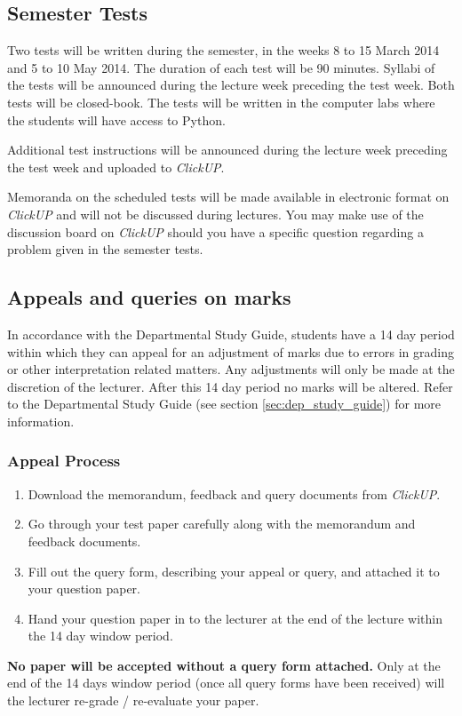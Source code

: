     \subsection{Semester Tests}
        Two tests will be written during the semester, in the weeks 8 to 15
        March 2014 and 5 to 10 May 2014. The duration of each test will be
        90 minutes. Syllabi of the tests will be announced during the lecture
        week preceding the test week. Both tests will be closed-book. The
        tests will be written in the computer labs where the students will
        have access to Python.

        Additional test instructions will be announced during the lecture
        week preceding the test week and uploaded to {\it ClickUP}.

        Memoranda on the scheduled tests will be made available in electronic
        format on {\it ClickUP} and will not be discussed during lectures. You may
        make use of the discussion board on {\it ClickUP} should you have a specific
        question regarding a problem given in the semester tests.

    \subsection{Appeals and queries on marks}
        In accordance with the Departmental Study Guide, students have a 14
        day period within which they can appeal for an adjustment of marks
        due to errors in grading or other interpretation related matters.
        Any adjustments will only be made at the discretion of the lecturer.
        After this 14 day period no marks will be altered. Refer to the
        Departmental Study Guide (see section \ref{sec:dep_study_guide})
        for more information.

        \subsubsection{Appeal Process}
            \begin{enumerate}
                \item Download the memorandum, feedback and query documents
                    from {\it ClickUP}.
                \item Go through your test paper carefully along with the
                    memorandum and feedback documents.
                \item Fill out the query form, describing your appeal or query,
                    and attached it to your question paper.
                \item Hand your question paper in to the lecturer at the end of
                    the lecture within the 14 day window period.
            \end{enumerate}

            \textbf{No paper will be accepted without a query form attached.}
            Only at the end of the 14 days window period (once all query forms
            have been received) will the lecturer re-grade / re-evaluate your
            paper.
